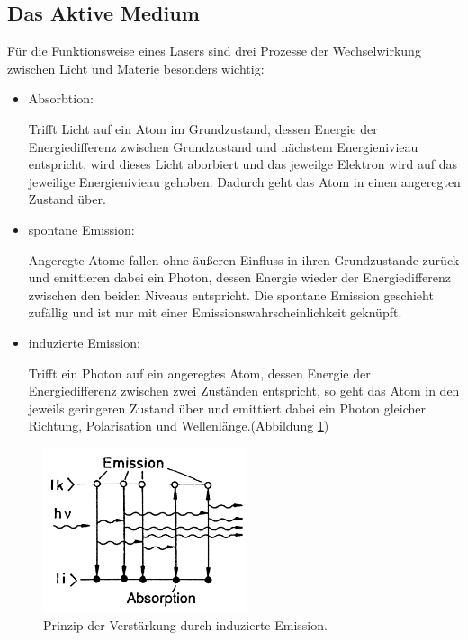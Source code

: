 \subsection{Das Aktive Medium}
Für die Funktionsweise eines Lasers sind drei Prozesse der Wechselwirkung zwischen Licht und Materie besonders wichtig:
\begin{itemize}
    \item Absorbtion:

    Trifft Licht auf ein Atom im Grundzustand, dessen Energie der Energiedifferenz zwischen Grundzustand und nächstem Energienivieau entspricht, wird dieses Licht aborbiert und das jeweilge Elektron wird auf das jeweilige Energienivieau gehoben. Dadurch geht das Atom in einen angeregten Zustand über.

    \item spontane Emission:

    Angeregte Atome fallen ohne äußeren Einfluss in ihren Grundzustande zurück und emittieren dabei ein Photon, dessen Energie wieder der Energiedifferenz zwischen den beiden Niveaus entspricht. Die spontane Emission geschieht zufällig und ist nur mit einer Emissionswahrscheinlichkeit geknüpft. 

    \item induzierte Emission:

    Trifft ein Photon auf ein angeregtes Atom, dessen Energie der Energiedifferenz zwischen zwei Zuständen entspricht, so geht das Atom in den jeweils geringeren Zustand über und emittiert dabei ein Photon gleicher Richtung, Polarisation und Wellenlänge.(Abbildung \ref{fig:ver})
\end{itemize}

\begin{figure}
    \centering
    \includegraphics[width=6cm]{Bilder/verstaerkung.PNG}
    \caption{Prinzip der Verstärkung durch induzierte Emission.\cite{Laserspektroskopie_1}}
    \label{fig:ver}
\end{figure}

